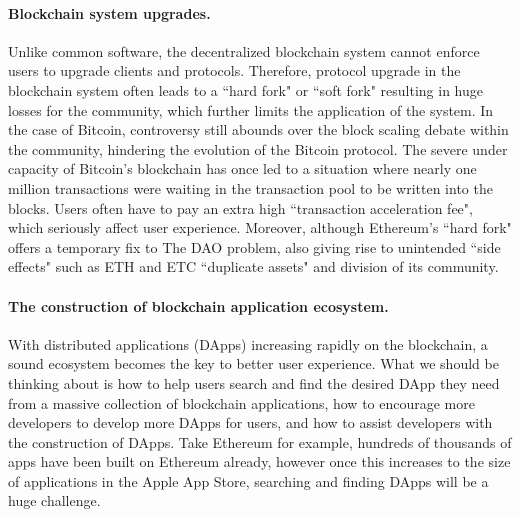 \paragraph{Blockchain system upgrades.} Unlike common software, the decentralized blockchain system cannot enforce users to upgrade clients and protocols. Therefore, protocol upgrade in the blockchain system often leads to a 	``hard fork" or ``soft fork"  resulting in huge losses for the community, which further limits the application of the system. In the case of Bitcoin, controversy still abounds over the block scaling debate within the community, hindering the evolution of the Bitcoin protocol. The severe under capacity of Bitcoin's blockchain has once led to a situation where nearly one million transactions were waiting in the transaction pool to be written into the blocks. Users often have to pay an extra high ``transaction acceleration fee", which seriously affect user experience. Moreover, although Ethereum's ``hard fork" offers a temporary fix to The DAO problem, also giving rise to unintended ``side effects" such as ETH and ETC ``duplicate assets" and division of its community.

\paragraph{The construction of blockchain application ecosystem.} With distributed applications (DApps) increasing rapidly on the blockchain, a sound ecosystem becomes the key to better user experience. What we should be thinking about is how to help users search and find the desired DApp they need from a massive collection of blockchain applications, how to encourage more developers to develop more DApps for users, and how to assist developers with the construction of DApps. Take Ethereum for example,  hundreds of thousands of apps have been built on Ethereum already, however once this increases to the size of applications in the Apple App Store, searching and finding DApps will be a huge challenge.



